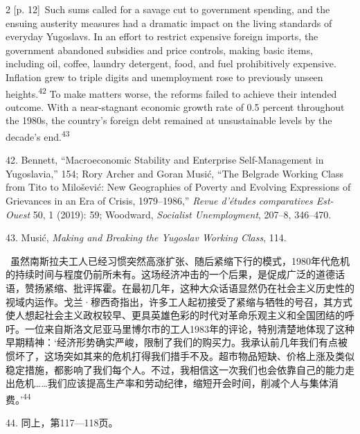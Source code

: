 \documentclass[10pt,a4paper]{article}
\begin{document}
\begin{paracol}{2}
\switchcolumn
{\scriptsize\color{gray} [p. 12]}\ Such sums called for a savage cut to government spending, and the ensuing austerity measures had a dramatic impact on the living standards of everyday Yugoslavs. In an effort to restrict expensive foreign imports, the government abandoned subsidies and price controls, making basic items, including oil, coffee, laundry detergent, food, and fuel prohibitively expensive. Inflation grew to triple digits and unemployment rose to previously unseen heights.\nobreak\textsuperscript{42} To make matters worse, the reforms failed to achieve their intended outcome. With a near-stagnant economic growth rate of 0.5 percent throughout the 1980s, the country’s foreign debt remained at unsustainable levels by the decade’s end.\nobreak\textsuperscript{43}\par{\small 42. Bennett, “Macroeconomic Stability and Enterprise Self-Management in Yugoslavia,” 154; Rory Archer and Goran Musić, “The Belgrade Working Class from Tito to Milošević: New Geographies of Poverty and Evolving Expressions of Grievances in an Era of Crisis, 1979–1986,” \textit{Revue d’études comparatives Est-Ouest} 50, 1 (2019): 59; Woodward, \textit{Socialist Unemployment}, 207–8, 346–470.\par}{\small 43. Musić, \textit{Making and Breaking the Yugoslav Working Class}, 114.\par}
\switchcolumn*
{\scriptsize\color{gray} [p. 12]}\ 虽然南斯拉夫工人已经习惯突然高涨扩张、随后紧缩下行的模式，1980年代危机的持续时间与程度仍前所未有。这场经济冲击的一个后果，是促成广泛的道德话语，赞扬紧缩、批评挥霍。在最初几年，这种大众话语显然仍在社会主义历史性的视域内运作。戈兰·穆西奇指出，许多工人起初接受了紧缩与牺牲的号召，其方式使人想起社会主义政权较早、更具英雄色彩的时代对革命乐观主义和全国团结的呼吁。一位来自斯洛文尼亚马里博尔市的工人1983年的评论，特别清楚地体现了这种早期精神：‘经济形势确实严峻，限制了我们的购买力。我承认前几年我们有点被惯坏了，这场突如其来的危机打得我们措手不及。超市物品短缺、价格上涨及类似稳定措施，都影响了我们每个人。不过，我相信这一次我们也会依靠自己的能力走出危机……我们应该提高生产率和劳动纪律，缩短开会时间，削减个人与集体消费。’\nobreak\textsuperscript{44}\par{\small 44. 同上，第117—118页。\par}
\switchcolumn

\end{paracol}
\end{document}
